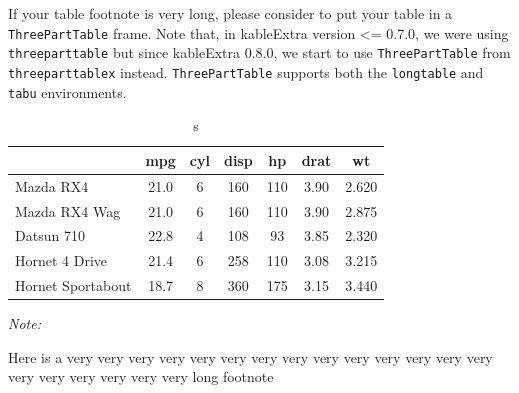 \documentclass[table]{article}
\newenvironment{Shaded}{\begin{snugshade}}{\end{snugshade}}
\newcommand{\DataTypeTok}[1]{\textcolor[rgb]{0.13,0.29,0.53}{#1}}
\newcommand{\KeywordTok}[1]{\textcolor[rgb]{0.13,0.29,0.53}{\textbf{#1}}}
\newcommand{\NormalTok}[1]{#1}
\newcommand{\OperatorTok}[1]{\textcolor[rgb]{0.81,0.36,0.00}{\textbf{#1}}}
\newcommand{\StringTok}[1]{\textcolor[rgb]{0.31,0.60,0.02}{#1}}
\begin{document}
If your table footnote is very long, please consider to put your table
in a \texttt{ThreePartTable} frame. Note that, in kableExtra version
\textless{}= 0.7.0, we were using \texttt{threeparttable} but since
kableExtra 0.8.0, we start to use \texttt{ThreePartTable} from
\texttt{threeparttablex} instead. \texttt{ThreePartTable} supports both
the \texttt{longtable} and \texttt{tabu} environments.

\begin{Shaded}
\end{Shaded}

\begin{table}[t]

\caption{\label{tab:unnamed-chunk-36}s}
\centering
\begin{threeparttable}
\begin{tabular}{lcccccc}
\toprule
  & mpg & cyl & disp & hp & drat & wt\\
\midrule
Mazda RX4 & 21.0 & 6 & 160 & 110 & 3.90 & 2.620\\
Mazda RX4 Wag & 21.0 & 6 & 160 & 110 & 3.90 & 2.875\\
Datsun 710 & 22.8 & 4 & 108 & 93 & 3.85 & 2.320\\
Hornet 4 Drive & 21.4 & 6 & 258 & 110 & 3.08 & 3.215\\
Hornet Sportabout & 18.7 & 8 & 360 & 175 & 3.15 & 3.440\\
\bottomrule
\end{tabular}
\begin{tablenotes}
\item \textit{Note: } 
\item Here is a very very very very very very very very very very very very very very very very very very very very long footnote
\end{tablenotes}
\end{threeparttable}
\end{table}
\end{document}
